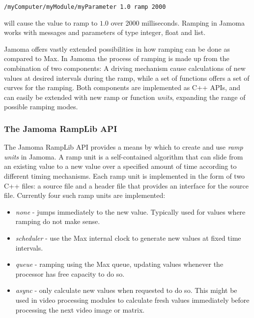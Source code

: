 \documentclass{sig-alternate}
\begin{document}
\texttt{/myComputer/myModule/myParameter 1.0 ramp 2000}

will cause the value to ramp to $1.0$ over 2000 milliseconds. Ramping in Jamoma works with messages and parameters of type integer, float and list.

Jamoma offers vastly extended possibilities in how ramping can be done as compared to Max. In Jamoma the process of ramping is made up from the combination of two components: A driving mechanism cause calculations of new values at desired intervals during the ramp, while a set of functions offers a set of curves for the ramping. Both components are implemented as C++ APIs, and can easily be extended with new ramp or function \emph{units}, expanding the range of possible ramping modes.



\subsubsection{The Jamoma RampLib API} %
\label{ssub:the_ramp_lib}

The Jamoma RampLib API provides a means by which to create and use \emph{ramp units} in Jamoma.  A ramp unit is a self-contained algorithm that can slide from an existing value to a new value over a specified amount of time according to different timing mechanisms. Each ramp unit is implemented in the form of two C++ files: a source file and a header file that provides an interface for the source file. Currently four such ramp units are implemented:

\begin{itemize}

	\item \emph{none} - jumps immediately to the new value. Typically used for values where ramping do not make sense.

	\item \emph{scheduler} - use the Max internal clock to generate new values at fixed time intervals.

	\item \emph{queue} - ramping using the Max queue, updating values whenever the processor has free capacity to do so.

	\item \emph{async} - only calculate new values when requested to do so. This might be used in video processing modules to calculate fresh values immediately before processing the next video image or matrix.
	
\end{itemize}
\end{document}
